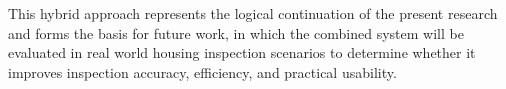 This hybrid approach represents the logical continuation of the present research and forms the basis for future work, in which the combined system will be evaluated in real world housing inspection scenarios to determine whether it improves inspection accuracy, efficiency, and practical usability.

